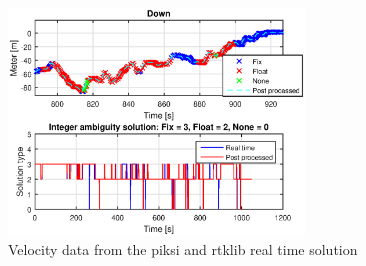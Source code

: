 \begin{figure}[H]
	\centering
		\includegraphics[width=0.7\textwidth]{figs/plots/landingDownFlight.eps}
		\caption{Velocity data from the piksi and rtklib real time solution}
		\label{figure:numSatFlight}
\end{figure}
\cleardoublepage